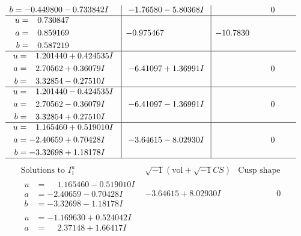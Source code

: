 \documentclass[1p]{elsarticle_modified}
\theoremstyle{definition}
\newcommand{\I}{\sqrt{-1}}
\begin{document}
$$\begin{array}{c|c|c}
\begin{aligned}
b &= -0.449800 - 0.733842 I\end{aligned}
 & -1.76580 - 5.80368 I & \phantom{-0.000000 } 0 \\ \hline\begin{aligned}
u &= \phantom{-}0.730847\phantom{ +0.000000I} \\
a &= \phantom{-}0.859169\phantom{ +0.000000I} \\
b &= \phantom{-}0.587219\phantom{ +0.000000I}\end{aligned}
 & -0.975467\phantom{ +0.000000I} & -10.7830\phantom{ +0.000000I} \\ \hline\begin{aligned}
u &= \phantom{-}1.201440 + 0.424535 I \\
a &= \phantom{-}2.70562 + 0.36079 I \\
b &= \phantom{-}3.32854 - 0.27510 I\end{aligned}
 & -6.41097 + 1.36991 I & \phantom{-0.000000 } 0 \\ \hline\begin{aligned}
u &= \phantom{-}1.201440 - 0.424535 I \\
a &= \phantom{-}2.70562 - 0.36079 I \\
b &= \phantom{-}3.32854 + 0.27510 I\end{aligned}
 & -6.41097 - 1.36991 I & \phantom{-0.000000 } 0 \\ \hline\begin{aligned}
u &= \phantom{-}1.165460 + 0.519010 I \\
a &= -2.40659 + 0.70428 I \\
b &= -3.32698 + 1.18178 I\end{aligned}
 & -3.64615 - 8.02930 I & \phantom{-0.000000 } 0\\
 \hline 
 \end{array}$$\newpage$$\begin{array}{c|c|c}  
\text{Solutions to }I^u_{1}& \I (\text{vol} + \sqrt{-1}CS) & \text{Cusp shape}\\
 \hline 
\begin{aligned}
u &= \phantom{-}1.165460 - 0.519010 I \\
a &= -2.40659 - 0.70428 I \\
b &= -3.32698 - 1.18178 I\end{aligned}
 & -3.64615 + 8.02930 I & \phantom{-0.000000 } 0 \\ \hline\begin{aligned}
u &= -1.169630 + 0.524042 I \\
a &= \phantom{-}2.37148 + 1.66417 I \\

\end{aligned}
\end{array}$$
\end{document}
